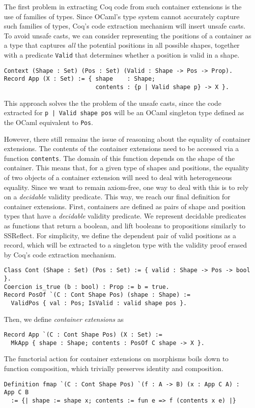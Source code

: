 \documentclass[a4paper, UKenglish, cleveref, autoref, thm-restate]{lipics-v2021}
\begin{document}
The first problem in extracting Coq code from such container extensions is the
use of families of types. Since OCaml's type system cannot accurately capture
such families of types, Coq's code extraction mechanism will insert unsafe
casts. To avoid unsafe casts, we can consider representing the positions of a
container as a type that captures \emph{all} the potential positions in all
possible shapes, together with a predicate \texttt{Valid} that
determines whether a position is valid in a shape.
\begin{verbatim}
Context (Shape : Set) (Pos : Set) (Valid : Shape -> Pos -> Prop).
Record App (X : Set) := { shape    : Shape; 
                          contents : {p | Valid shape p} -> X }.
\end{verbatim}
This approach solves the the problem of the unsafe casts, since the code
extracted for \texttt{{p | Valid shape pos}} will be an OCaml singleton
type defined as the OCaml equivalent to \texttt{Pos}.

However, there still remains the issue of reasoning about the equality of
container extensions. The contents of the container extensions need to be
accessed via a function \texttt{contents}. The domain of this function
depends on the shape of the container. This means that, for a given type of
shapes and positions, the equality of two objects of a container extension will
need to deal with heterogeneous equality. Since we want to remain axiom-free,
one way to deal with this is to rely on a \emph{decidable} validity predicate.
This way, we reach our final definition for container extensions. First,
containers are defined as pairs of shape and position types that have a
\emph{decidable} validity predicate. We represent decidable predicates as
functions that return a boolean, and lift booleans to propositions similarly to
SSReflect. For simplicity, we define the dependent pair of valid positions as a
record, which will be extracted to a singleton type with the validity proof
erased by Coq's code extraction mechanism.
\begin{verbatim}
Class Cont (Shape : Set) (Pos : Set) := { valid : Shape -> Pos -> bool }.
Coercion is_true (b : bool) : Prop := b = true.
Record PosOf `(C : Cont Shape Pos) (shape : Shape) := 
  ValidPos { val : Pos; IsValid : valid shape pos }.
\end{verbatim}
Then, we define \emph{container extensions} as
\begin{verbatim}
Record App `(C : Cont Shape Pos) (X : Set) :=
  MkApp { shape : Shape; contents : PosOf C shape -> X }.
\end{verbatim}
The functorial action for container extensions on morphisms boils down to
function composition, which trivially preserves identity and composition.
\begin{verbatim}
Definition fmap `(C : Cont Shape Pos) `(f : A -> B) (x : App C A) : App C B
  := {| shape := shape x; contents := fun e => f (contents x e) |}
\end{verbatim}
\end{document}
